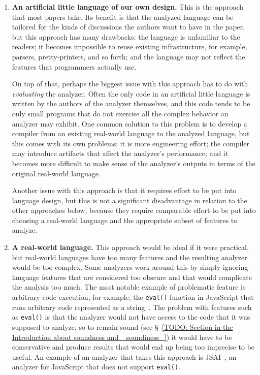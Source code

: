 \documentclass[12pt, oneside]{book}
\begin{document}
\begin{enumerate}
\item \textbf{An artificial little language of our own design.} This is the approach that most papers take. Its benefit is that the analyzed language can be tailored for the kinds of discussions the authors want to have in the paper, but this approach has many drawbacks: the language is unfamiliar to the readers; it becomes impossible to reuse existing infrastructure, for example, parsers, pretty-printers, and so forth; and the language may not reflect the features that programmers actually use.

On top of that, perhaps the biggest issue with this approach has to do with \emph{evaluating} the analyzer. Often the only code in an artificial little language is written by the authors of the analyzer themselves, and this code tends to be only small programs that do not exercise all the complex behavior an analyzer may exhibit. One common solution to this problem is to develop a compiler from an existing real-world language to the analyzed language, but this comes with its own problems: it is more engineering effort; the compiler may introduce artifacts that affect the analyzer’s performance; and it becomes more difficult to make sense of the analyzer’s outputs in terms of the original real-world language.

Another issue with this approach is that it requires effort to be put into language design, but this is not a significant disadvantage in relation to the other approaches below, because they require comparable effort to be put into choosing a real-world language and the appropriate subset of features to analyze.

\item \textbf{A real-world language.} This approach would be ideal if it were practical, but real-world languages have too many features and the resulting analyzer would be too complex. Some analyzers work around this by simply ignoring language features that are considered too obscure and that would complicate the analysis too much. The most notable example of problematic feature is arbitrary code execution, for example, the \texttt{eval()} function in JavaScript that runs arbitrary code represented as a string~\cite{eval}. The problem with features such as \texttt{eval()} is that the analyzer would not have access to the code that it was supposed to analyze, so to remain sound (see §~\ref{TODO: Section in the Introduction about soundness and _soundiness_}) it would have to be conservative and produce results that would end up being too imprecise to be useful. An example of an analyzer that takes this approach is JSAI~\cite{jsai}, an analyzer for JavaScript that does not support \texttt{eval()}.


\end{enumerate}
\end{document}
